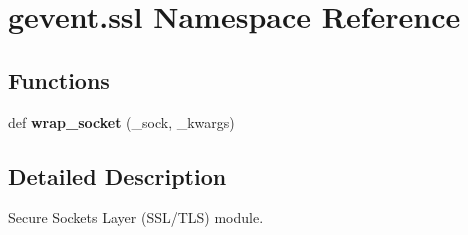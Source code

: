 \hypertarget{namespacegevent_1_1ssl}{}\section{gevent.\+ssl Namespace Reference}
\label{namespacegevent_1_1ssl}
\subsection*{Functions}
\begin{DoxyCompactItemize}
\item 
\mbox{\label{namespacegevent_1_1ssl_a92b85704ceb460cb0c9e0a06efac7f38}} 
def {\bfseries wrap\+\_\+socket} (\+\_\+sock, \+\_\+kwargs)
\end{DoxyCompactItemize}


\subsection{Detailed Description}
\begin{DoxyVerb}Secure Sockets Layer (SSL/TLS) module.
\end{DoxyVerb}
 